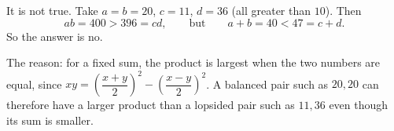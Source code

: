 It is not true. Take $a=b=20$, $c=11$, $d=36$ (all greater than $10$). Then
\[
ab=400>396=cd,\qquad\text{but}\qquad a+b=40<47=c+d .
\]
So the answer is $\boxed{\text{no}}$.

The reason: for a fixed sum, the product is largest when the two numbers are equal, since $xy=\left(\dfrac{x+y}{2}\right)^2-\left(\dfrac{x-y}{2}\right)^2$. A balanced pair such as $20,20$ can therefore have a larger product than a lopsided pair such as $11,36$ even though its sum is smaller.
